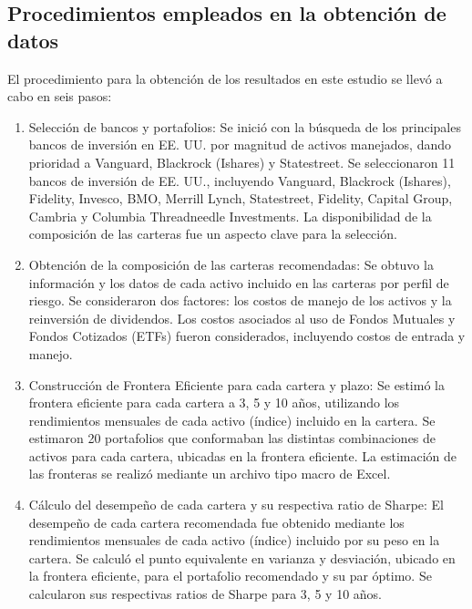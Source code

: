 \documentclass[a4paper,fleqn]{cas-sc}
\begin{document}
\subsection{Procedimientos empleados en la obtención de datos}

El procedimiento para la obtención de los resultados en este estudio se llevó a cabo en seis pasos:

\begin{enumerate}[1.]
    \item Selección de bancos y portafolios: Se inició con la búsqueda de los principales bancos de inversión en EE. UU. por magnitud de activos manejados, dando prioridad a Vanguard, Blackrock (Ishares) y Statestreet. Se seleccionaron 11 bancos de inversión de EE. UU., incluyendo Vanguard, Blackrock (Ishares), Fidelity, Invesco, BMO, Merrill Lynch, Statestreet, Fidelity, Capital Group, Cambria y Columbia Threadneedle Investments. La disponibilidad de la composición de las carteras fue un aspecto clave para la selección.

    \item Obtención de la composición de las carteras recomendadas: Se obtuvo la información y los datos de cada activo incluido en las carteras por perfil de riesgo. Se consideraron dos factores: los costos de manejo de los activos y la reinversión de dividendos. Los costos asociados al uso de Fondos Mutuales y Fondos Cotizados (ETFs) fueron considerados, incluyendo costos de entrada y manejo.

    \item Construcción de Frontera Eficiente para cada cartera y plazo: Se estimó la frontera eficiente para cada cartera a 3, 5 y 10 años, utilizando los rendimientos mensuales de cada activo (índice) incluido en la cartera. Se estimaron 20 portafolios que conformaban las distintas combinaciones de activos para cada cartera, ubicadas en la frontera eficiente. La estimación de las fronteras se realizó mediante un archivo tipo macro de Excel.

    \item Cálculo del desempeño de cada cartera y su respectiva ratio de Sharpe: El desempeño de cada cartera recomendada fue obtenido mediante los rendimientos mensuales de cada activo (índice) incluido por su peso en la cartera. Se calculó el punto equivalente en varianza y desviación, ubicado en la frontera eficiente, para el portafolio recomendado y su par óptimo. Se calcularon sus respectivas ratios de Sharpe para 3, 5 y 10 años.


\end{enumerate}
\end{document}
